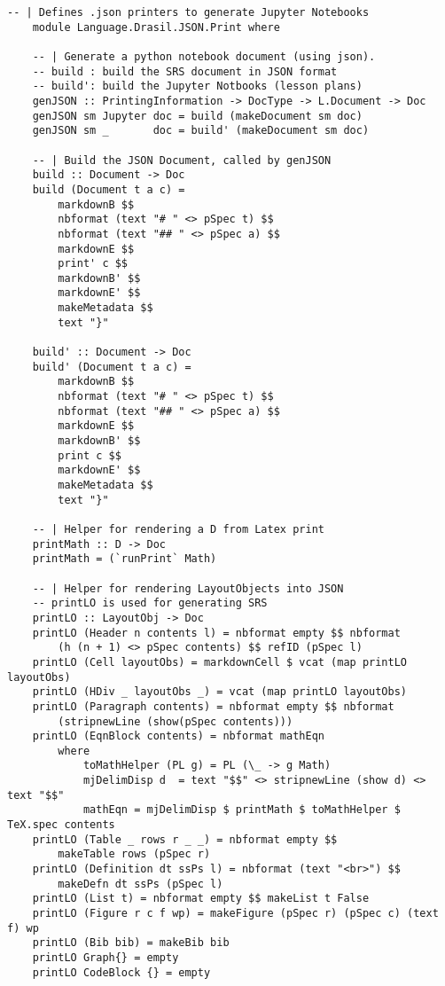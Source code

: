 \begin{lstlisting}[language=haskell1, 
	basicstyle=\linespread{1.1}\small\ttfamily]
	-- | Defines .json printers to generate Jupyter Notebooks
	module Language.Drasil.JSON.Print where
	
	-- | Generate a python notebook document (using json).
	-- build : build the SRS document in JSON format
	-- build': build the Jupyter Notbooks (lesson plans)
	genJSON :: PrintingInformation -> DocType -> L.Document -> Doc
	genJSON sm Jupyter doc = build (makeDocument sm doc)
	genJSON sm _       doc = build' (makeDocument sm doc)
		
	-- | Build the JSON Document, called by genJSON
	build :: Document -> Doc
	build (Document t a c) = 
		markdownB $$
		nbformat (text "# " <> pSpec t) $$
		nbformat (text "## " <> pSpec a) $$
		markdownE $$
		print' c $$
		markdownB' $$
		markdownE' $$
		makeMetadata $$
		text "}" 

	build' :: Document -> Doc
	build' (Document t a c) = 
		markdownB $$
		nbformat (text "# " <> pSpec t) $$
		nbformat (text "## " <> pSpec a) $$
		markdownE $$
		markdownB' $$ 
		print c $$
		markdownE' $$
		makeMetadata $$
		text "}" 

	-- | Helper for rendering a D from Latex print
	printMath :: D -> Doc
	printMath = (`runPrint` Math)
		
	-- | Helper for rendering LayoutObjects into JSON
	-- printLO is used for generating SRS
	printLO :: LayoutObj -> Doc
	printLO (Header n contents l) = nbformat empty $$ nbformat 
		(h (n + 1) <> pSpec contents) $$ refID (pSpec l)
	printLO (Cell layoutObs) = markdownCell $ vcat (map printLO layoutObs)
	printLO (HDiv _ layoutObs _) = vcat (map printLO layoutObs)
	printLO (Paragraph contents) = nbformat empty $$ nbformat 
		(stripnewLine (show(pSpec contents)))
	printLO (EqnBlock contents) = nbformat mathEqn
		where
			toMathHelper (PL g) = PL (\_ -> g Math)
			mjDelimDisp d  = text "$$" <> stripnewLine (show d) <> text "$$" 
			mathEqn = mjDelimDisp $ printMath $ toMathHelper $ TeX.spec contents
	printLO (Table _ rows r _ _) = nbformat empty $$ 
		makeTable rows (pSpec r)
	printLO (Definition dt ssPs l) = nbformat (text "<br>") $$ 
		makeDefn dt ssPs (pSpec l)
	printLO (List t) = nbformat empty $$ makeList t False
	printLO (Figure r c f wp) = makeFigure (pSpec r) (pSpec c) (text f) wp
	printLO (Bib bib) = makeBib bib
	printLO Graph{} = empty 
	printLO CodeBlock {} = empty
		

\end{lstlisting}
